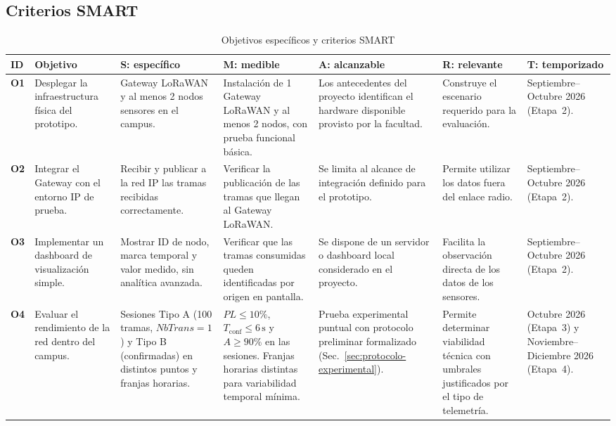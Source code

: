 \documentclass[12pt,oneside,openany,spanish,oldfontcommands]{memoir}
\renewcommand{\arraystretch}{1.15}
\begin{document}
\subsection{Criterios SMART}

\begin{table}[H]
\centering
\caption{Objetivos específicos y criterios SMART}
\label{tab:smart}
\tiny
\setlength{\tabcolsep}{3pt}
\renewcommand{\arraystretch}{1.25}
\begin{tabularx}{\textwidth}{
  >{\bfseries\centering\arraybackslash}p{0.5cm}
  >{\raggedright\arraybackslash}p{2.0cm}
  >{\raggedright\arraybackslash\hsize=1.05\hsize}X
  >{\raggedright\arraybackslash\hsize=1.05\hsize}X
  >{\raggedright\arraybackslash\hsize=0.95\hsize}X
  >{\raggedright\arraybackslash\hsize=0.95\hsize}X
  >{\raggedright\arraybackslash\hsize=1.00\hsize}X}
\toprule
\textbf{ID} &
\textbf{Objetivo} &
\textbf{S: específico} &
\textbf{M: medible} &
\textbf{A: alcanzable} &
\textbf{R: relevante} &
\textbf{T: temporizado}\\
\midrule
O1 &
Desplegar la infraestructura física del prototipo. &
1 Gateway LoRaWAN y al menos 2 nodos sensores en el campus. &
Instalación de 1 Gateway LoRaWAN y al menos 2 nodos, con prueba funcional básica. &
Los antecedentes del proyecto identifican el hardware disponible provisto por la facultad. &
Construye el escenario requerido para la evaluación. &
Septiembre--Octubre 2026 (Etapa~2).\\
\midrule
O2 &
Integrar el Gateway con el entorno IP de prueba. &
Recibir y publicar a la red IP las tramas recibidas correctamente. &
Verificar la publicación de las tramas que llegan al Gateway LoRaWAN. &
Se limita al alcance de integración definido para el prototipo. &
Permite utilizar los datos fuera del enlace radio. &
Septiembre--Octubre 2026 (Etapa~2).\\
\midrule
O3 &
Implementar un dashboard de visualización simple. &
Mostrar ID de nodo, marca temporal y valor medido, sin analítica avanzada. &
Verificar que las tramas consumidas queden identificadas por origen en pantalla. &
Se dispone de un servidor o dashboard local considerado en el proyecto. &
Facilita la observación directa de los datos de los sensores. &
Septiembre--Octubre 2026 (Etapa~2).\\
\midrule
O4 &
Evaluar el rendimiento de la red dentro del campus. &
Sesiones Tipo A (100 tramas, $NbTrans=1$) y Tipo B (confirmadas) en distintos puntos y franjas horarias. &
$PL \leq 10\%$, $T_{\mathrm{conf}} \leq 6\,\text{s}$ y $A \geq 90\%$ en las sesiones. Franjas horarias distintas para variabilidad temporal mínima. &
Prueba experimental puntual con protocolo preliminar formalizado (Sec.~\ref{sec:protocolo-experimental}). &
Permite determinar viabilidad técnica con umbrales justificados por el tipo de telemetría. &
Octubre 2026 (Etapa~3) y Noviembre--Diciembre 2026 (Etapa~4).\\
\bottomrule
\end{tabularx}
\end{table}
\end{document}
